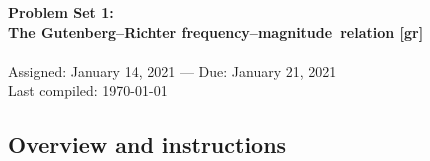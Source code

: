 \documentclass[11pt,titlepage,fleqn]{article}
\newcommand{\fmag}{frequency--magnitude}
\begin{document}

\begin{spacing}{1.2}
\centering
{\large \bf Problem Set 1: \\
The Gutenberg--Richter \fmag\ relation [gr]} \\
\cltag\ \\
Assigned: January 14, 2021 --- Due: January 21, 2021 \\
Last compiled: \today
\end{spacing}


\subsection*{Overview and instructions}
\end{document}
